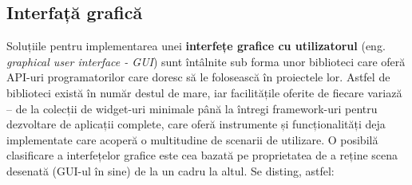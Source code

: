 \documentclass[12pt,a4paper]{report}
\begin{document}
\subsection{Interfață grafică}
Soluțiile pentru implementarea unei \textbf{interfețe grafice cu utilizatorul} (eng. \textit{graphical user interface - GUI}) sunt întâlnite sub forma unor biblioteci care oferă API-uri programatorilor care doresc să le folosească în proiectele lor. Astfel de biblioteci există în număr destul de mare, iar facilitățile oferite de fiecare variază -- de la colecții de widget-uri minimale până la întregi framework-uri pentru dezvoltare de aplicații complete, care  oferă instrumente și funcționalități deja implementate care acoperă o multitudine de scenarii de utilizare. O posibilă clasificare a interfețelor grafice este cea bazată pe proprietatea  de a reține scena desenată (GUI-ul în sine) de la un cadru la altul. Se disting, astfel:
\end{document}
